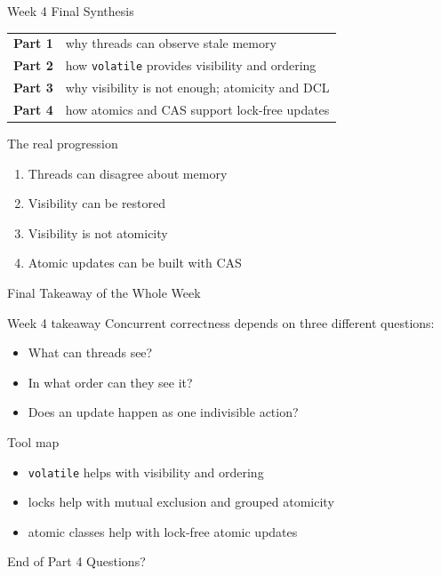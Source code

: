 \documentclass[aspectratio=169,11pt]{beamer}
\begin{document}
	\begin{frame}{Week 4 Final Synthesis}
		\centering
		\begin{tabular}{>{\bfseries}m{2.8cm} m{7.4cm}}
			Part 1 & why threads can observe stale memory \\
			Part 2 & how \texttt{volatile} provides visibility and ordering \\
			Part 3 & why visibility is not enough; atomicity and DCL \\
			Part 4 & how atomics and CAS support lock-free updates \\
		\end{tabular}
		
		\vspace{0.45cm}
		
		\begin{exampleblock}{The real progression}
			\begin{enumerate}
				\item Threads can disagree about memory
				\item Visibility can be restored
				\item Visibility is not atomicity
				\item Atomic updates can be built with CAS
			\end{enumerate}
		\end{exampleblock}
	\end{frame}
	
	\begin{frame}{Final Takeaway of the Whole Week}
		\begin{alertblock}{Week 4 takeaway}
			Concurrent correctness depends on three different questions:
			\begin{itemize}
				\item What can threads see?
				\item In what order can they see it?
				\item Does an update happen as one indivisible action?
			\end{itemize}
		\end{alertblock}
		
		\vspace{0.35cm}
		
		\begin{block}{Tool map}
			\begin{itemize}
				\item \texttt{volatile} helps with visibility and ordering
				\item locks help with mutual exclusion and grouped atomicity
				\item atomic classes help with lock-free atomic updates
			\end{itemize}
		\end{block}
	\end{frame}
	
	\begin{frame}{End of Part 4}
		\centering
		\Huge Questions?
	\end{frame}
	
\end{document}
